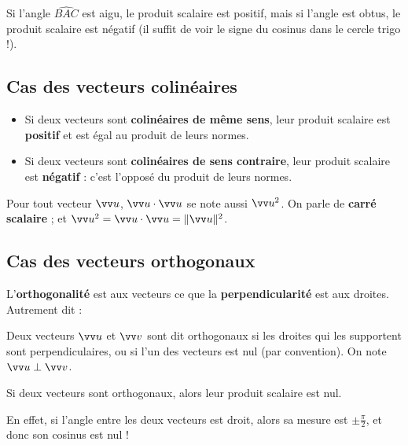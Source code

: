 \documentclass[a4paper,11pt]{article}
\begin{document}
\begin{crmq}
Si l'angle $\widehat{BAC}$ est aigu, le produit scalaire est positif, mais si l'angle est obtus, le produit scalaire est négatif (il suffit de voir le signe du cosinus dans le cercle trigo !).
\end{crmq}

\subsection{Cas des vecteurs colinéaires}

\begin{cprop}
\vspace{-0.2cm}
\begin{itemize}[leftmargin=*]
	\item Si deux vecteurs sont \textbf{colinéaires de même sens}, leur produit scalaire est \textbf{positif} et est égal au produit de leurs normes.
	\item Si deux vecteurs sont \textbf{colinéaires de sens contraire}, leur produit scalaire est \textbf{négatif} : c'est l'opposé du produit de leurs normes. 
\end{itemize}
\end{cprop}

\begin{crmq}
Pour tout vecteur $\vect{u}$, $\vect{u}\cdot\vect{u}$ se note aussi $\vect{u}^2$. On parle de \textbf{carré scalaire} ; et $\vect{u}^2=\vect{u}\cdot\vect{u}=\|\vect{u}\|^2$.
\end{crmq}

\subsection{Cas des vecteurs orthogonaux}

\begin{cdefi}
L'\textbf{orthogonalité} est aux vecteurs ce que la \textbf{perpendicularité} est aux droites. Autrement dit :

Deux vecteurs $\vect{u}$ et $\vect{v}$ sont dit orthogonaux si les droites qui les supportent sont perpendiculaires, ou si l'un des vecteurs est nul (par convention). On note $ \vect{u} \perp \vect{v}$.
\end{cdefi}

\begin{cprop}
Si deux vecteurs sont orthogonaux, alors leur produit scalaire est nul.
\end{cprop}

\begin{cdemo}
En effet, si l'angle entre les deux vecteurs est droit, alors sa mesure est $\pm\frac{\pi}{2}$, et donc son cosinus est nul !
\end{cdemo}
\end{document}

